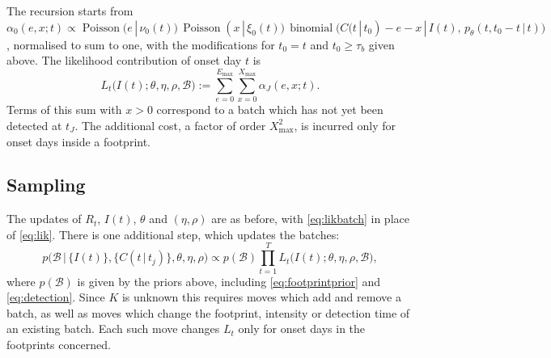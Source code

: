 \documentclass[11pt,a4paper]{article}
\newcommand{\given}{\,|\,}
\newcommand{\bin}{\operatorname{binomial}}
\newcommand{\pois}{\operatorname{Poisson}}
\newcommand{\Emax}{E_{\max}}
\newcommand{\Xmax}{X_{\max}}
\begin{document}
The recursion starts from
$\alpha_0(e,x;t)\propto\pois(e\given\nu_0(t))\,\pois(x\given\xi_0(t))\,
\bin\bigl(C(t\given t_0)-e-x\given I(t),\,p_\theta(t,t_0-t\given t)\bigr)$,
normalised to sum to one, with the modifications for $t_0=t$ and
$t_0\ge\tau_b$ given above. The likelihood contribution of onset day $t$ is
\begin{equation}\label{eq:likbatch}
L_t\bigl(I(t);\theta,\eta,\rho,\mathcal{B}\bigr)
:=\sum_{e=0}^{\Emax}\sum_{x=0}^{\Xmax}\alpha_J(e,x;t).
\end{equation}
Terms of this sum with $x>0$ correspond to a batch which has not yet been
detected at $t_J$. The additional cost, a factor of order $\Xmax^2$, is
incurred only for onset days inside a footprint.

\subsection{Sampling}

The updates of $R_t$, $I(t)$, $\theta$ and $(\eta,\rho)$ are as before, with
\eqref{eq:likbatch} in place of \eqref{eq:lik}. There is one additional step,
which updates the batches:
\begin{equation}
p\bigl(\mathcal{B}\,\big|\,\{I(t)\},\{C(t\given t_j)\},\theta,\eta,\rho\bigr)
\propto p(\mathcal{B})\prod_{t=1}^{T}L_t\bigl(I(t);\theta,\eta,\rho,\mathcal{B}\bigr),
\end{equation}
where $p(\mathcal{B})$ is given by the priors above, including
\eqref{eq:footprintprior} and \eqref{eq:detection}. Since $K$ is unknown this requires moves which add and
remove a batch, as well as moves which change the footprint, intensity or
detection time of an existing batch. Each such move changes $L_t$ only for
onset days in the footprints concerned.
\end{document}
